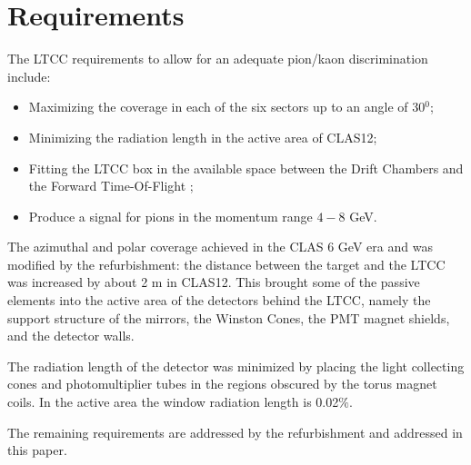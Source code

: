 \section{Requirements}


The LTCC requirements to allow for an adequate pion/kaon discrimination include:


\begin{itemize}
	\item Maximizing the coverage in each of the six sectors up to an angle of 30$^0$;
	\item Minimizing the radiation length in the active area of CLAS12;
	\item Fitting the LTCC box in the available space between the Drift Chambers \cite{dc2019} and the Forward Time-Of-Flight \cite{ftof2019};
	\item Produce a signal for pions in the momentum range $4-8$ GeV.
\end{itemize}

The azimuthal and polar coverage achieved in the CLAS 6 GeV era and was modified by the refurbishment:
the distance between the target and the LTCC was increased by about 2 m in CLAS12. This brought some of the passive
elements into the active area of the detectors behind the LTCC, namely the support structure of the mirrors, the Winston
Cones, the PMT magnet shields, and the detector walls.

The radiation length of the detector was minimized by placing the light collecting cones and photomultiplier tubes
in the regions obscured by the torus magnet coils. In the active area the window radiation length is 0.02$\%$.

The remaining requirements are addressed by the refurbishment and addressed in this paper.
